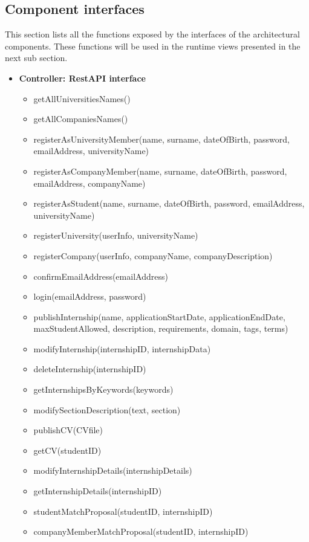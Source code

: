 \subsection{Component interfaces}
This section lists all the functions exposed by the interfaces of the architectural components. These functions will be used in the runtime views presented in the next sub section.
\begin{itemize}
    \item \textbf{Controller: RestAPI interface}
    \begin{itemize}
        \item getAllUniversitiesNames()
        \item getAllCompaniesNames()
        \item registerAsUniversityMember(name, surname, dateOfBirth, password, emailAddress, universityName)
        \item registerAsCompanyMember(name, surname, dateOfBirth, password, emailAddress, companyName)
        \item registerAsStudent(name, surname, dateOfBirth, password, emailAddress, universityName)
        \item registerUniversity(userInfo, universityName)
        \item registerCompany(userInfo, companyName, companyDescription)
        \item confirmEmailAddress(emailAddress)
        \item login(emailAddress, password)
        \item publishInternship(name, applicationStartDate, applicationEndDate, maxStudentAllowed, description, requirements, domain, tags, terms)
        \item modifyInternship(internshipID, internshipData)
        \item deleteInternship(internshipID)
        \item getInternshipsByKeywords(keywords)
        \item modifySectionDescription(text, section)
        \item publishCV(CVfile)
        \item getCV(studentID)
        \item modifyInternshipDetails(internshipDetails)
        \item getInternshipDetails(internshipID)
        \item studentMatchProposal(studentID, internshipID)
        \item companyMemberMatchProposal(studentID, internshipID)

\end{itemize}
\end{itemize}

